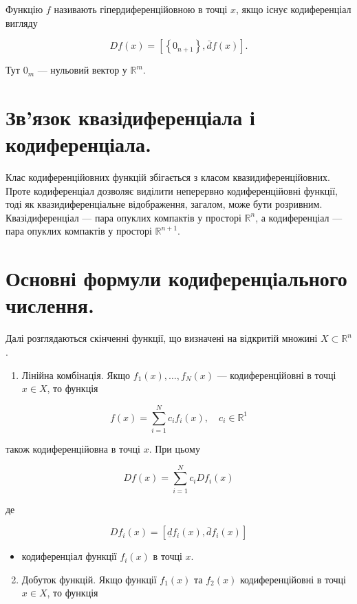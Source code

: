\documentclass[12pt,a4paper]{extarticle}
\numberwithin{section}{part}
\begin{document}
Функцію $f$ називають гіпердиференційовною в точці $x$, якщо існує кодиференціал вигляду

$$
D f(x)=\left[\left\{0_{n+1}\right\}, \bar{d} f(x)\right] .
$$

Тут $0_{m}$ --- нульовий вектор у $\mathbb{R}^{m}$.

\section{Зв'язок квазідиференціала і кодиференціала.}
Клас кодиференційовних функцій збігається з класом квазидиференційовних. Проте кодиференціал дозволяє виділити неперервно кодиференційовні функції, тоді як квазидиференціальне відображення, загалом, може бути розривним.\\
Квазідиференціал --- пара опуклих компактів у просторі $\mathbb{R}^{n}$, а кодиференціал --- пара опуклих компактів у просторі $\mathbb{R}^{n+1}$.

\section{Основні формули кодиференціального числення.}
Далі розглядаються скінченні функції, що визначені на відкритій множині $X \subset \mathbb{R}^{n}$.

\begin{enumerate}
  \item Лінійна комбінація. Якщо $f_{1}(x), \ldots, f_{N}(x)$ --- кодиференційовні в точці $x \in X$, то функція
\end{enumerate}

$$
f(x)=\sum_{i=1}^{N} c_{i} f_{i}(x), \quad c_{i} \in \mathbb{R}^{1}
$$

також кодиференційовна в точці $x$. При цьому

$$
D f(x)=\sum_{i=1}^{N} c_{i} D f_{i}(x)
$$

де

$$
D f_{i}(x)=\left[\underline{d} f_{i}(x), \bar{d} f_{i}(x)\right]
$$

\begin{itemize}
  \item кодиференціал функції $f_{i}(x)$ в точці $x$.
\end{itemize}

\begin{enumerate}
  \setcounter{enumi}{1}
  \item Добуток функцій. Якщо функції $f_{1}(x)$ та $f_{2}(x)$ кодиференційовні в точці $x \in X$, то функція
\end{enumerate}
\end{document}
